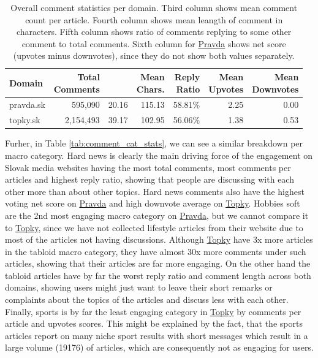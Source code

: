 \documentclass[11pt,a4paper]{article}
\def\topky{\href{https://topky.sk}{Topky}}
\def\pravda{\href{https://pravda.sk}{Pravda}}
\begin{document}
\begin{table}[H]
	\centering
	\small
	\begin{tabular}{@{}lrrrrrr@{}}
		\toprule
		\textbf{Domain} & \makecell{\textbf{Total}                                          \\ \textbf{Comments}} & \makecell{\textbf{Per Art.}} & \makecell{\textbf{Mean} \\ \textbf{Chars.}} & \makecell{\textbf{Reply} \\ \textbf{Ratio}} & \makecell{\textbf{Mean} \\ \textbf{Upvotes}} & \makecell{\textbf{Mean} \\ \textbf{Downvotes}} \\ \midrule
		pravda.sk       & 595,090                  & 20.16 & 115.13 & 58.81\% & 2.25 & 0.00 \\
		topky.sk        & 2,154,493                & 39.17 & 102.95 & 56.06\% & 1.38 & 0.53 \\ \bottomrule
	\end{tabular}
	\caption{Overall comment statistics per domain. Third column shows mean comment count per article. Fourth column shows mean leangth of comment in characters. Fifth column shows ratio of comments replying to some other comment to total comments. Sixth column for \pravda{} shows net score (upvotes minus downvotes), since they do not show both values separately.}
	\label{tab:comment_stats}
\end{table}

Furher, in Table \ref{tab:comment_cat_stats}, we can see a similar breakdown per macro category. Hard news is clearly the main driving force of the engagement on Slovak media websites having the most total comments, most comments per articles and highest reply ratio, showing that people are discussing with each other more than about other topics.  Hard news comments also have the highest voting net score on \pravda{} and high downvote average on \topky{}. Hobbies soft are the 2nd most engaging macro category on \pravda{}, but we cannot compare it to \topky{}, since we have not collected lifestyle articles from their website due to most of the articles not having discussions. Although \topky{} have 3x more articles in the tabloid macro category, they have almost 30x more comments under such articles, showing that their articles are far more engaging. On the other hand the tabloid articles have by far the worst reply ratio and comment length across both domains, showing users might just want to leave their short remarks or complaints about the topics of the articles and discuss less with each other. Finally, sports is by far the least engaging category in \topky{} by comments per article and upvotes scores. This might be explained by the fact, that the sports articles report on many niche sport results with short messages which result in a large volume (19176) of articles, which are consequently not as engaging for users.
\end{document}
